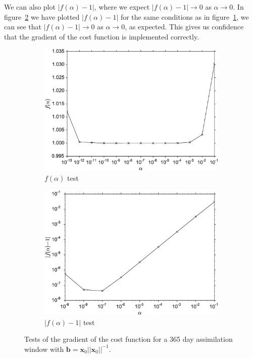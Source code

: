 We can also plot $|f(\alpha)-1|$, where we expect $|f(\alpha)-1| \rightarrow 0$ as $\alpha \rightarrow 0$.  In figure~\ref{chap6:fig:cost} we have plotted $|f(\alpha)-1|$ for the same conditions as in figure~\ref{chap6:fig:costone}, we can see that $|f(\alpha) - 1| \rightarrow 0$ as $\alpha \rightarrow 0$, as expected. This gives us confidence that the gradient of the cost function is implemented correctly.

\begin{figure}[ht]
    \centering
    \begin{subfigure}[b]{0.49\textwidth}
        \includegraphics[width=\textwidth]{chapter/chapter6/costone_cvt.eps}
        \caption{$f(\alpha)$ test}
        \label{chap6:fig:costone}
    \end{subfigure}
    \begin{subfigure}[b]{0.49\textwidth}
        \includegraphics[width=\textwidth]{chapter/chapter6/cost_cvt.eps}
        \caption{$|f(\alpha) - 1|$ test}
        \label{chap6:fig:cost}
    \end{subfigure}
    \caption{Tests of the gradient of the cost function for a 365 day assimilation window with $\textbf{b}=\textbf{x}_0||\textbf{x}_0||^{-1}$.}
    \label{chap6:fig:testgradcostone}
\end{figure}

